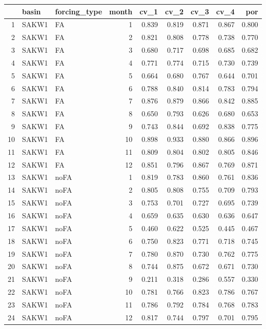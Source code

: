 \documentclass{agujournal2019}
\begin{document}
\begin{table}[ht]
\centering
\begin{tabular}{rllrrrrrr}
  \hline
 & basin & forcing\_type & month & cv\_1 & cv\_2 & cv\_3 & cv\_4 & por \\ 
  \hline
1 & SAKW1 & FA &    1 & 0.839 & 0.819 & 0.871 & 0.867 & 0.800 \\ 
  2 & SAKW1 & FA &    2 & 0.821 & 0.808 & 0.778 & 0.738 & 0.770 \\ 
  3 & SAKW1 & FA &    3 & 0.680 & 0.717 & 0.698 & 0.685 & 0.682 \\ 
  4 & SAKW1 & FA &    4 & 0.771 & 0.774 & 0.715 & 0.730 & 0.739 \\ 
  5 & SAKW1 & FA &    5 & 0.664 & 0.680 & 0.767 & 0.644 & 0.701 \\ 
  6 & SAKW1 & FA &    6 & 0.788 & 0.840 & 0.814 & 0.783 & 0.794 \\ 
  7 & SAKW1 & FA &    7 & 0.876 & 0.879 & 0.866 & 0.842 & 0.885 \\ 
  8 & SAKW1 & FA &    8 & 0.650 & 0.793 & 0.626 & 0.680 & 0.653 \\ 
  9 & SAKW1 & FA &    9 & 0.743 & 0.844 & 0.692 & 0.838 & 0.775 \\ 
  10 & SAKW1 & FA &   10 & 0.898 & 0.933 & 0.880 & 0.866 & 0.896 \\ 
  11 & SAKW1 & FA &   11 & 0.809 & 0.804 & 0.802 & 0.805 & 0.846 \\ 
  12 & SAKW1 & FA &   12 & 0.851 & 0.796 & 0.867 & 0.769 & 0.871 \\ 
  13 & SAKW1 & noFA &    1 & 0.819 & 0.783 & 0.860 & 0.761 & 0.836 \\ 
  14 & SAKW1 & noFA &    2 & 0.805 & 0.808 & 0.755 & 0.709 & 0.793 \\ 
  15 & SAKW1 & noFA &    3 & 0.753 & 0.701 & 0.727 & 0.695 & 0.739 \\ 
  16 & SAKW1 & noFA &    4 & 0.659 & 0.635 & 0.630 & 0.636 & 0.647 \\ 
  17 & SAKW1 & noFA &    5 & 0.460 & 0.622 & 0.525 & 0.445 & 0.467 \\ 
  18 & SAKW1 & noFA &    6 & 0.750 & 0.823 & 0.771 & 0.718 & 0.745 \\ 
  19 & SAKW1 & noFA &    7 & 0.780 & 0.870 & 0.730 & 0.762 & 0.775 \\ 
  20 & SAKW1 & noFA &    8 & 0.744 & 0.875 & 0.672 & 0.671 & 0.730 \\ 
  21 & SAKW1 & noFA &    9 & 0.211 & 0.318 & 0.286 & 0.557 & 0.330 \\ 
  22 & SAKW1 & noFA &   10 & 0.781 & 0.766 & 0.823 & 0.786 & 0.767 \\ 
  23 & SAKW1 & noFA &   11 & 0.786 & 0.792 & 0.784 & 0.768 & 0.783 \\ 
  24 & SAKW1 & noFA &   12 & 0.817 & 0.744 & 0.797 & 0.701 & 0.795 \\ 
   \hline
\end{tabular}
\end{table}
\end{document}
